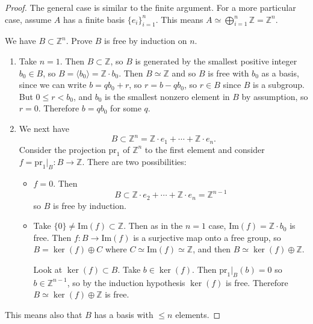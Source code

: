 \begin{proof}
The general case is similar to the finite argument.
For a more particular case, assume $A$ has a finite basis
$\{e_i\}_{i = 1}^n$.
This means $A \simeq \bigoplus_{i = 1}^n \mathbb{Z} = \mathbb{Z}^n$.

We have $B \subset \mathbb{Z}^n$. Prove $B$ is free by induction on
$n$.

\begin{enumerate}
  \item{
    Take $n = 1$. Then $B \subset \mathbb{Z}$, so $B$ is generated
    by the smallest positive integer $b_0 \in B$, so
    $B = \langle b_0 \rangle = \mathbb{Z} \cdot b_0$. Then
    $B \simeq \mathbb{Z}$ and so $B$ is free with $b_0$ as a
    basis, since we can write $b = q b_0 + r$, so
    $r = b - q b_0$, so $r \in B$ since $B$ is a subgroup. But
    $0 \leq r < b_0$, and $b_0$ is the smallest nonzero element in
    $B$ by assumption, so $r = 0$. Therefore $b = q b_0$ for some $q$.
  }
  \item{
    We next have
    $$
    B \subset \mathbb{Z}^n = \mathbb{Z} \cdot e_1
                           + \cdots
                           + \mathbb{Z} \cdot e_n.
    $$
    Consider the projection $\mathrm{pr}_1$ of $\mathbb{Z}^n$ to the
    first element and consider
    $f = \mathrm{pr}_1|_B : B \to \mathbb{Z}$. There are two
    possibilities:
    \begin{itemize}
      \item{
        $f = 0$. Then
        $$
        B \subset \mathbb{Z} \cdot e_2 + \cdots + \mathbb{Z} \cdot e_n
          =       \mathbb{Z}^{n-1}
        $$
        so $B$ is free by induction.
      }
      \item{
        Take $\{ 0 \} \neq \mathrm{Im}(f) \subset \mathbb{Z}$. Then as
        in the $n = 1$ case, $\mathrm{Im}(f) = \mathbb{Z} \cdot b_0$
        is free. Then $f : B \to \mathrm{Im}(f)$ is a surjective map
        onto a free group, so
        $B = \ker(f) \oplus C$ where $C \simeq \mathrm{Im}(f) \simeq
        \mathbb{Z}$, and then
        $B \simeq \ker(f) \oplus \mathbb{Z}$.

        Look at $\ker(f) \subset B$. Take $b \in \ker (f)$. Then
        $\mathrm{pr}_1|_B(b) = 0$ so $b \in \mathbb{Z}^{n-1}$, so by
        the induction hypothesis $\ker(f)$ is free. Therefore
        $B \simeq \ker(f) \oplus \mathbb{Z}$ is free.
      }
    \end{itemize}
  }
\end{enumerate}
This means also that $B$ has a basis with $\leq n$ elements.
\end{proof}

